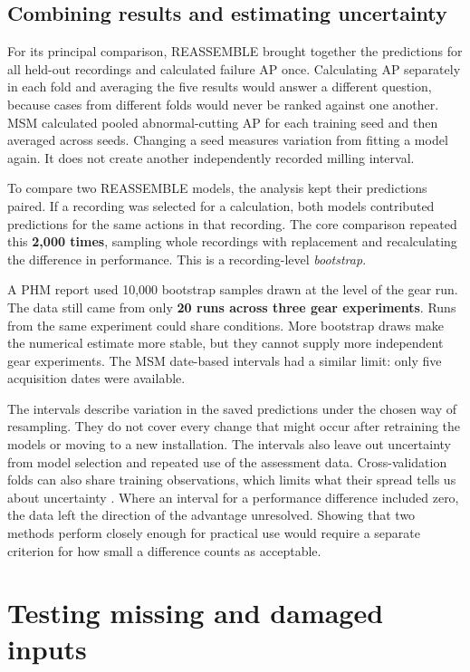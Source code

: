 \subsection{Combining results and estimating uncertainty}

For its principal comparison, REASSEMBLE brought together the predictions for all
held-out recordings and calculated failure AP once. Calculating AP separately in each
fold and averaging the five results would answer a different question, because cases
from different folds would never be ranked against one another. MSM calculated pooled
abnormal-cutting AP for each training seed and then averaged across seeds. Changing a
seed measures variation from fitting a model again. It does not create another
independently recorded milling interval.

To compare two REASSEMBLE models, the analysis kept their predictions paired. If a
recording was selected for a calculation, both models contributed predictions for the
same actions in that recording. The core comparison repeated this \textbf{2,000 times},
sampling whole recordings with replacement and recalculating the difference in
performance. This is a recording-level \emph{bootstrap}.

A PHM report used 10,000 bootstrap samples drawn at the level of the gear run. The data
still came from only \textbf{20 runs across three gear experiments}. Runs from the same
experiment could share conditions. More bootstrap draws make the numerical estimate more
stable, but they cannot supply more independent gear experiments. The MSM date-based
intervals had a similar limit: only five acquisition dates were available.

The intervals describe variation in the saved predictions under the chosen way of
resampling. They do not cover every change that might occur after retraining the models
or moving to a new installation. The intervals also leave out uncertainty from model
selection and repeated use of the assessment data. Cross-validation folds can also share
training observations, which limits what their spread tells us about uncertainty
\parencite{Bengio2004CVVariance}. Where an interval for a performance difference
included zero, the data left the direction of the advantage unresolved. Showing that two
methods perform closely enough for practical use would require a separate criterion for
how small a difference counts as acceptable.

\section{Testing missing and damaged inputs}
\label{sec:ch4-robustness}

